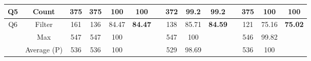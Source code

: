 \begin{table}
\begin{tabular}{cccccclccclccc}
Q5                              & Count                               & 375                                   & 375                                                                    & 100                                                                       & \textbf{100}                    &                      & 372                                                                    & 99.2                                                                      & \textbf{99.2}                   &                      & 375                                                                    & 100                                                                       & \textbf{100}                    \\ \hline
\multirow{3}{*}{Q6}             & Filter                              & 161                                   & 136                                                                    & 84.47                                                                     & \multirow{3}{*}{\textbf{84.47}} &                      & 138                                                                    & 85.71                                                                     & \multirow{3}{*}{\textbf{84.59}} &                      & 121                                                                    & 75.16                                                                     & \multirow{3}{*}{\textbf{75.02}} \\
                                & Max                                 & 547                                   & 547                                                                    & 100                                                                       &                                 &                      & 547                                                                    & 100                                                                       &                                 &                      & 546                                                                    & 99.82                                                                     &                                 \\
                                & Average (P)                         & 536                                   & 536                                                                    & 100                                                                       &                                 &                      & 529                                                                    & 98.69                                                                     &                                 &                      & 536                                                                    & 100                                                                       &                                 \\ \hline

\end{tabular}
\end{table}
